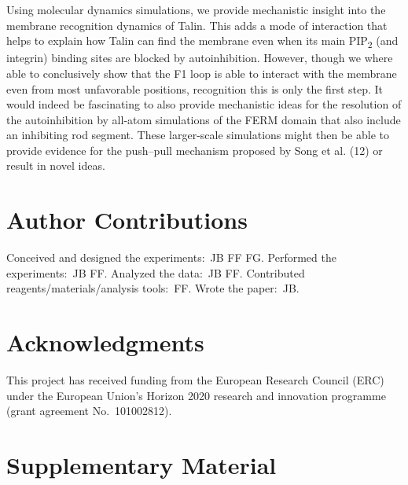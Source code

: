 \documentclass[
  letterpaper,
  DIV=11,
  numbers=noendperiod]{scrartcl}
\begin{document}
Using molecular dynamics simulations, we provide mechanistic insight
into the membrane recognition dynamics of Talin. This adds a mode of
interaction that helps to explain how Talin can find the membrane even
when its main PIP\textsubscript{2} (and integrin) binding sites are
blocked by autoinhibition. However, though we where able to conclusively
show that the F1 loop is able to interact with the membrane even from
most unfavorable positions, recognition this is only the first step. It
would indeed be fascinating to also provide mechanistic ideas for the
resolution of the autoinhibition by all-atom simulations of the FERM
domain that also include an inhibiting rod segment. These larger-scale
simulations might then be able to provide evidence for the push--pull
mechanism proposed by Song et al. (12) or result in novel ideas.

\hypertarget{author-contributions}{%
\section{Author Contributions}\label{author-contributions}}

Conceived and designed the experiments:~JB FF FG. Performed the
experiments:~JB FF. Analyzed the data:~JB FF. Contributed
reagents/materials/analysis tools:~FF. Wrote the paper:~JB.

\hypertarget{acknowledgments}{%
\section{Acknowledgments}\label{acknowledgments}}

This project has received funding from the European Research Council
(ERC) under the European Union's Horizon 2020 research and innovation
programme (grant agreement No.~101002812).

\hypertarget{supplementary-material}{%
\section{Supplementary Material}\label{supplementary-material}}
\end{document}
